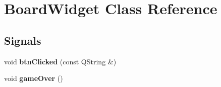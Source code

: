 \hypertarget{classBoardWidget}{
\section{BoardWidget Class Reference}
\label{classBoardWidget}
}
\subsection*{Signals}
\begin{DoxyCompactItemize}
\item 
\hypertarget{classBoardWidget_a00ddffd485b28f196f5a51511b581db3}{
void {\bfseries btnClicked} (const QString \&)}
\label{classBoardWidget_a00ddffd485b28f196f5a51511b581db3}

\item 
\hypertarget{classBoardWidget_a0fe034ae76547640984420bd55ea6d99}{
void {\bfseries gameOver} ()}
\label{classBoardWidget_a0fe034ae76547640984420bd55ea6d99}

\end{DoxyCompactItemize}
